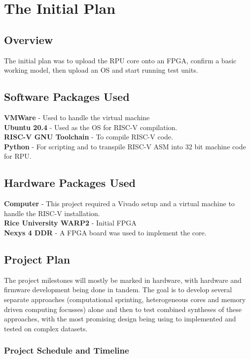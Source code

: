 

\section{The Initial Plan}
	\subsection{Overview}
		The initial plan was to upload the RPU core onto an FPGA, confirm a basic working model, then upload an OS and start running test units.
	
	\subsection{Software Packages Used}
		\textbf{VMWare} - Used to handle the virtual machine\\
		\textbf{Ubuntu 20.4} - Used as the OS for RISC-V compilation.\\
		\textbf{RISC-V GNU Toolchain} - To compile RISC-V code.\\
		\textbf{Python} - For scripting and to transpile RISC-V ASM into 32 bit machine code for RPU. \\
	
	\subsection{Hardware Packages Used}
		\textbf{Computer} - This project required a Vivado setup and a virtual machine to handle the RISC-V installation.\\
		\textbf{Rice University WARP2} - Initial FPGA\\
		\textbf{Nexys 4 DDR} - A  FPGA board was used to implement the core.
	
	\subsection{Project Plan}
		The project milestones will mostly be marked in hardware, with hardware and firmware development being done in tandem. The goal is to develop several separate approaches (computational sprinting, heterogeneous cores and memory driven computing focusses) alone and then to test combined syntheses of these approaches, with the most promising design being using to implemented and tested on complex datasets.
		\subsubsection{Project Schedule and Timeline}
		
